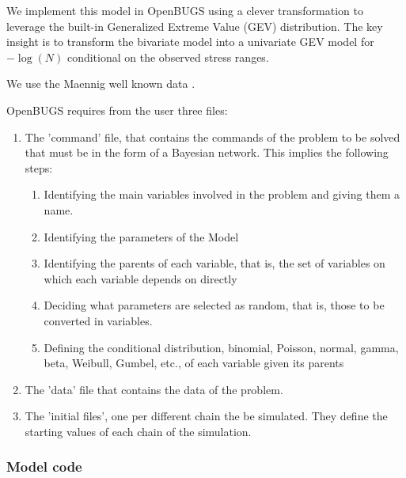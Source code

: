 We implement this model in OpenBUGS using a clever transformation to leverage the built-in Generalized Extreme Value (GEV) distribution. The key insight is to transform the bivariate model into a univariate GEV model for $-\log(N)$ conditional on the observed stress ranges.

We use the Maennig well known data \cite{maennig1967}.

OpenBUGS requires from the user three files:
\begin{enumerate}
\item The 'command' file, that contains the commands of the problem to be solved that must be in the form of a Bayesian network. This implies the following steps:
\begin{enumerate}
\item Identifying the main variables involved in the problem and giving them a name.
\item Identifying the parameters of the Model
\item Identifying the parents of each variable, that is, the set of variables on which each variable depends on directly
\item Deciding what parameters are selected as random, that is, those to be converted in variables.
\item Defining the conditional distribution, binomial, Poisson, normal, gamma, beta, Weibull, Gumbel, etc., of each variable given its parents
\end{enumerate}
\item The 'data' file that contains the data of the problem.
\item The 'initial files', one per different chain the be simulated. They define the starting values of each chain of the simulation.
\end{enumerate}

\subsubsection*{Model code}

